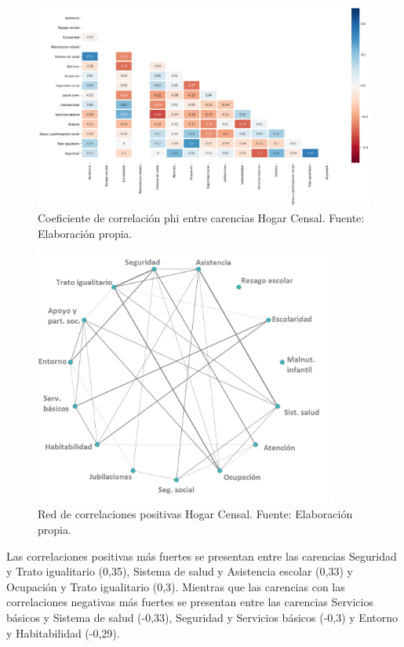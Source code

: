 \documentclass[12pt,letterpaper,spanish]{article}
\begin{document}
\begin{figure}[H]
    \centering
    \includegraphics[width=\textwidth]{Heatmaps/Heatmap_pearson_car_censal.png}
    \caption{Coeficiente de correlación phi entre carencias Hogar Censal. Fuente: Elaboración propia.}
    \label{HMCensal}
\end{figure}

\begin{figure}[H]
  \centering
    \includegraphics[width=10cm]{Grafos/grafo_censal_pos.png}
    \caption{Red de correlaciones positivas Hogar Censal. Fuente: Elaboración propia.}
    \label{RedCensalpos}
\end{figure}


Las correlaciones positivas más fuertes se presentan entre las carencias Seguridad y Trato igualitario (0,35), Sistema de salud y Asistencia escolar (0,33) y Ocupación y Trato igualitario (0,3). Mientras que las carencias con las correlaciones negativas más fuertes se presentan entre las carencias Servicios básicos y Sistema de salud (-0,33), Seguridad y Servicios básicos (-0,3) y Entorno y Habitabilidad (-0,29). 
\end{document}
